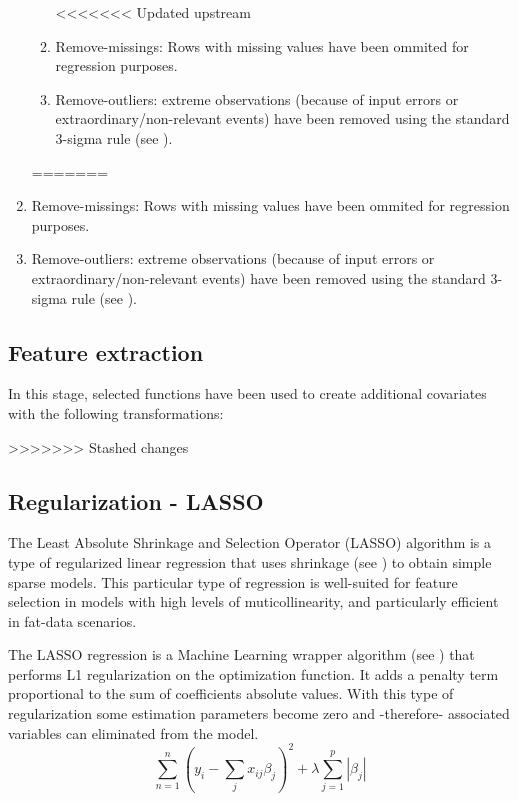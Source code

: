 \documentclass{article}
\begin{document}
\begin{enumerate}
\begin{enumerate}
<<<<<<< Updated upstream
    \item Remove-missings: Rows with missing values have been ommited for regression purposes.
  


  \item Remove-outliers: extreme observations (because of input errors or extraordinary/non-relevant events) have been removed using the standard 3-sigma rule (see \cite{lehmann2013}).
\end{enumerate}
=======
  \item Remove-missings: Rows with missing values have been ommited for regression purposes.

  

  \item Remove-outliers: extreme observations (because of input errors or extraordinary/non-relevant events) have been removed using the standard 3-sigma rule (see \cite{lehmann2013}).
\end{enumerate}
\subsection{Feature extraction}

In this stage, selected functions have been used to create additional covariates with the following transformations:  

\begin{enumerate}
\end{enumerate}
>>>>>>> Stashed changes
\subsection{Regularization - LASSO}
The Least Absolute Shrinkage and Selection Operator (LASSO) algorithm is a type of regularized linear regression that uses shrinkage (see \cite{tibshirani1996}) to obtain simple sparse models. This particular type of regression is well-suited for feature selection in models with high levels of muticollinearity, and particularly efficient in fat-data scenarios.

The LASSO regression is a Machine Learning wrapper algorithm (see \cite{chandrashekar2014}) that performs L1 regularization on the optimization function. It adds a penalty term proportional to the sum of coefficients absolute values. With this type of regularization some estimation parameters become zero and -therefore- associated variables can eliminated from the model.
\begin{equation}
    \sum_{n=1}^{n}(y_i - \sum_{j}x_{ij}\beta_{j})^2 + \lambda \sum_{j=1}^p|\beta_{j}|
\end{equation}
\end{document}
